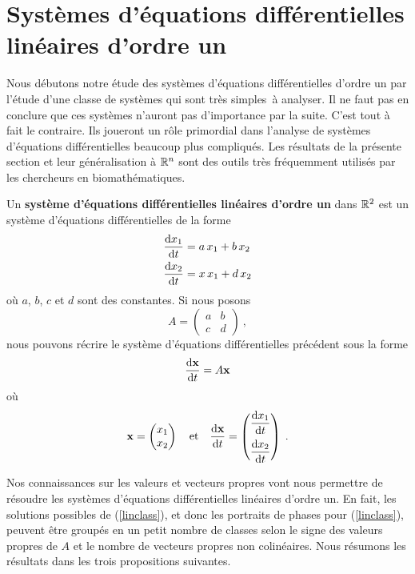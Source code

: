 {\section{Systèmes d'équations différentielles linéaires d'or\-dre un}

Nous débutons notre étude des systèmes d'équations différentielles
d'ordre un par l'étude d'une classe de systèmes qui sont \lgm très
simples\rgm\ à analyser.  Il ne faut pas en conclure que ces systèmes
n'auront pas d'importance par la suite.  C'est tout à fait le
contraire.  Ils joueront un rôle primordial dans l'analyse de systèmes
d'équations différentielles beaucoup plus compliqués. Les résultats de
la présente section et leur généralisation à $\mathbb{R}^n$ sont des outils
très fréquemment utilisés par les chercheurs en biomathématiques.

Un {\bfseries système d'équations différentielles linéaires d'ordre
un} dans
$\mathbb{R}^2$ est un système d'équations différentielles de la forme
\begin{align*}
\frac{\mathrm{d}x_1}{\mathrm{d}t} &= a\,x_1 + b\, x_2 \\
\frac{\mathrm{d}x_2}{\mathrm{d}t} &= x\,x_1 + d\, x_2
\end{align*}
où $a$, $b$, $c$ et $d$ sont des constantes.  Si nous posons
\[
A = \begin{pmatrix} a & b \\ c & d \end{pmatrix} \ ,
\]
nous pouvons récrire le système d'équations différentielles précédent sous la
forme
\begin{equation} \label{linclass}
\frac{\mathrm{d}\mathbf{x}}{\mathrm{d}t} = A \mathbf{x}
\end{equation}
où
\[
\mathbf{x} = \begin{pmatrix} x_1 \\ x_2 \end{pmatrix}
\quad \text{et} \quad
\frac{\mathrm{d}\mathbf{x}}{\mathrm{d}t} = 
\begin{pmatrix} \displaystyle \frac{\mathrm{d}x_1}{\mathrm{d}t} \\[2ex]
\displaystyle \frac{\mathrm{d}x_2}{\mathrm{d}t} \end{pmatrix} \; .
\]

Nos connaissances sur les valeurs et vecteurs propres vont nous
permettre de résoudre les systèmes d'équations différentielles
linéaires d'ordre un.  En fait, les solutions possibles de
(\ref{linclass}), et donc les portraits de phases pour
(\ref{linclass}), peuvent être groupés en un petit nombre de classes
selon le signe des valeurs propres de $A$ et le nombre de vecteurs
propres non colinéaires.  Nous résumons les résultats dans les trois
propositions suivantes.

}
